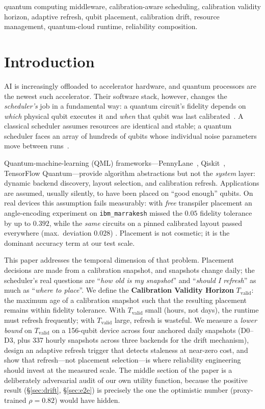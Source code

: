 \documentclass[journal,10pt,twocolumn]{IEEEtran}
\begin{document}
\begin{IEEEkeywords}
quantum computing middleware, calibration-aware scheduling, calibration validity horizon, adaptive refresh,
qubit placement, calibration drift, resource management, quantum-cloud runtime, reliability composition.
\end{IEEEkeywords}

\section{Introduction}
 AI is increasingly offloaded to accelerator hardware, and quantum processors are the
newest such accelerator. Their software stack, however, changes the \emph{scheduler's} job in a fundamental way: a
quantum circuit's fidelity depends on \emph{which} physical qubit executes it and \emph{when} that qubit was last
calibrated~\cite{preskill2018,arute2019,murali2019noise,li2019sabre}. A classical scheduler assumes resources are
identical and stable; a quantum scheduler faces an array of hundreds of qubits whose individual noise parameters
move between runs~\cite{ibmcalib,kanazawa2021,vanberg2023}.

Quantum-machine-learning (QML) frameworks---PennyLane~\cite{berholm2018}, Qiskit~\cite{qiskit}, TensorFlow
Quantum---provide algorithm abstractions but not the \emph{system} layer: dynamic backend discovery, layout
selection, and calibration refresh. Applications are assumed, usually silently, to have been placed on ``good
enough'' qubits. On real devices this assumption fails measurably: with \emph{free} transpiler placement an
angle-encoding experiment on \texttt{ibm\_marrakesh} missed the $0.05$ fidelity tolerance by up to $0.392$,
while the \emph{same} circuits on a pinned calibrated layout passed everywhere (max.\ deviation $0.028$)
\cite{tangpu}. Placement is not cosmetic; it is the dominant accuracy term at our test scale.

This paper addresses the temporal dimension of that problem. Placement decisions are made from a calibration
snapshot, and snapshots change daily; the scheduler's real questions are ``\emph{how old is my snapshot}'' and
``\emph{should I refresh}'' as much as ``\emph{where to place}''. We define the \textbf{Calibration Validity
Horizon} $T_{\mathrm{valid}}$: the maximum age of a calibration snapshot such that the resulting placement
remains within fidelity tolerance. With $T_{\mathrm{valid}}$ small (hours, not days), the runtime must refresh
frequently; with $T_{\mathrm{valid}}$ large, refresh is wasteful. We measure a \emph{lower bound} on
$T_{\mathrm{valid}}$ on a 156-qubit device across four anchored daily snapshots (D0--D3, plus 337 hourly
snapshots across three backends for the drift mechanism), design an adaptive refresh trigger that detects staleness at
near-zero cost, and show that refresh---not placement selection---is where reliability engineering
should invest at the measured scale.
The middle section of the paper is a deliberately adversarial audit of our own utility function, because the
positive result (\S\ref{sec:drift}, \S\ref{sec:e2e}) is precisely the one the optimistic number (proxy-trained
$\rho{=}0.82$) would have hidden.
\end{document}
